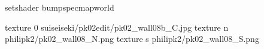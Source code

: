 setshader bumpspecmapworld

texture 0 suiseiseki/pk02edit/pk02_wall08b_C.jpg
texture n philipk2/pk02_wall08_N.png
texture s philipk2/pk02_wall08_S.png

